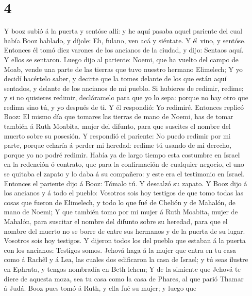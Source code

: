 \hypertarget{section-3}{%
\section{4}\label{section-3}}

 Y booz subió á la puerta y sentóse allí: y he aquí pasaba
aquel pariente del cual había Booz hablado, y díjole: Eh, fulano, ven
acá y siéntate. Y él vino, y sentóse.  Entonces él tomó diez
varones de los ancianos de la ciudad, y dijo: Sentaos aquí. Y ellos se
sentaron.  Luego dijo al pariente: Noemi, que ha vuelto del
campo de Moab, vende una parte de las tierras que tuvo nuestro hermano
Elimelech;  Y yo decidí hacértelo saber, y decirte que la
tomes delante de los que están aquí sentados, y delante de los ancianos
de mi pueblo. Si hubieres de redimir, redime; y si no quisieres redimir,
decláramelo para que yo lo sepa: porque no hay otro que redima sino tú,
y yo después de ti. Y él respondió: Yo redimiré.  Entonces
replicó Booz: El mismo día que tomares las tierras de mano de Noemi, has
de tomar también á Ruth Moabita, mujer del difunto, para que suscites el
nombre del muerto sobre su posesión.  Y respondió el
pariente: No puedo redimir por mi parte, porque echaría á perder mi
heredad: redime tú usando de mi derecho, porque yo no podré redimir.
 Había ya de largo tiempo esta costumbre en Israel en la
redención ó contrato, que para la confirmación de cualquier negocio, el
uno se quitaba el zapato y lo daba á su compañero: y este era el
testimonio en Israel.  Entonces el pariente dijo á Booz:
Tómalo tú. Y descalzó su zapato.  Y Booz dijo á los ancianos
y á todo el pueblo: Vosotros sois hoy testigos de que tomo todas las
cosas que fueron de Elimelech, y todo lo que fué de Chelión y de
Mahalón, de mano de Noemi;  Y que también tomo por mi mujer
á Ruth Moabita, mujer de Mahalón, para suscitar el nombre del difunto
sobre su heredad, para que el nombre del muerto no se borre de entre sus
hermanos y de la puerta de su lugar. Vosotros sois hoy testigos.
 Y dijeron todos los del pueblo que estaban á la puerta con
los ancianos: Testigos somos. Jehová haga á la mujer que entra en tu
casa como á Rachêl y á Lea, las cuales dos edificaron la casa de Israel;
y tú seas ilustre en Ephrata, y tengas nombradía en Beth-lehem;
 Y de la simiente que Jehová te diere de aquesta moza, sea
tu casa como la casa de Phares, al que parió Thamar á Judá.
 Booz pues tomó á Ruth, y ella fué su mujer; y luego que
